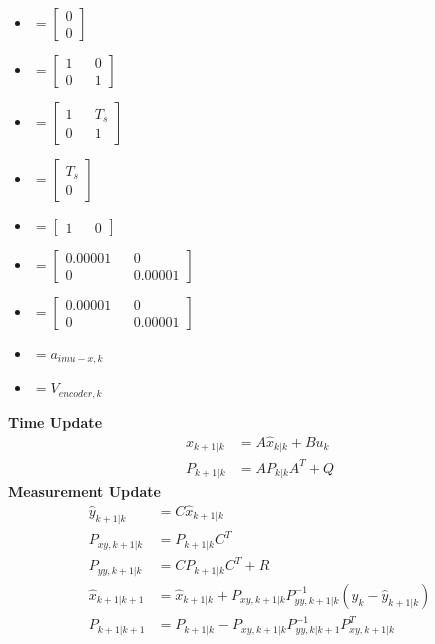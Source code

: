 \documentclass[12pt,a4paper]{article}
\begin{document}
	\begin{itemize}
		\item { 
			\(= \begin{bmatrix}
				0 \\
				0
			\end{bmatrix}\)}
		\item {
			\(= \begin{bmatrix}
				1 && 0\\
				0 && 1
			\end{bmatrix}\)}
		\item { 
			\(= \begin{bmatrix}
				1 && T_s\\
				0 && 1
			\end{bmatrix}\)}
		\item { 
			\(= \begin{bmatrix}
				T_s\\
				0
			\end{bmatrix}\)}
		\item { 
			\(= \begin{bmatrix}
				1 && 0
			\end{bmatrix}\)}
		\item { 
			\(= \begin{bmatrix}
				0.00001 && 0 \\
				0 && 0.00001
			\end{bmatrix}\)}
		\item { 
			\(= \begin{bmatrix}
				0.00001 && 0 \\
				0 && 0.00001
			\end{bmatrix}\)}
		\item { \(= a_{imu-x,k}\)}
		\item { \(= V_{encoder,k}\)}
	\end{itemize}
	\textbf{Time Update} \\
	\[
	\begin{split}
		\hat{x}_{k+1|k} &= A\hat{x}_{k|k} + Bu_k \\
		P_{k+1|k} &= AP_{k|k}A^T + Q
	\end{split}
	\]
	\textbf{Measurement Update} \\
	\[
	\begin{split}
		\hat{y}_{k+1|k} &= C\hat{x}_{k+1|k} \\
		P_{xy,k+1|k} &= P_{k+1|k}C^T  \\
		P_{yy,k+1|k} &= CP_{k+1|k}C^T + R \\
		\hat{x}_{k+1|k+1} &= \hat{x}_{k+1|k} + P_{xy,k+1|k}P^{-1}_{yy,k+1|k}(y_k - \hat{y}_{k+1|k}) \\
		P_{k+1|k+1} &= P_{k+1|k} - P_{xy,k+1|k}P^{-1}_{yy,k|k+1}P^T_{xy,k+1|k}
	\end{split}
	\]
	
\end{document}
